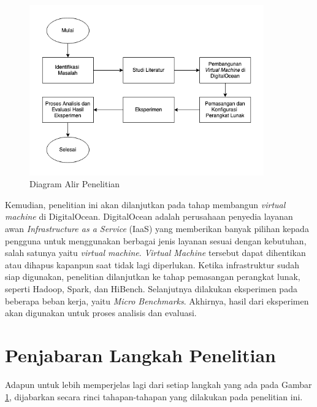 \begin{figure}[h!]
    \centering
    \includegraphics[width=0.9\textwidth]{figures/ch03/Diagram Tugas Akhir.png}
    \caption{Diagram Alir Penelitian}
    \label{fig:diagram alir}
\end{figure}

Kemudian, penelitian ini akan dilanjutkan pada tahap membangun \textit{virtual machine} di DigitalOcean. DigitalOcean adalah perusahaan penyedia layanan awan \textit{Infrastructure as a Service} (IaaS) yang memberikan banyak pilihan kepada pengguna untuk menggunakan berbagai jenis layanan sesuai dengan kebutuhan, salah satunya yaitu \textit{virtual machine}. \textit{Virtual Machine} tersebut dapat dihentikan atau dihapus kapanpun saat tidak lagi diperlukan. Ketika infrastruktur sudah siap digunakan, penelitian dilanjutkan ke tahap pemasangan perangkat lunak, seperti Hadoop, Spark, dan HiBench. Selanjutnya dilakukan eksperimen pada beberapa beban kerja, yaitu \textit{Micro Benchmarks}. Akhirnya, hasil dari eksperimen akan digunakan untuk proses analisis dan evaluasi.

\section{Penjabaran Langkah Penelitian}
Adapun untuk lebih memperjelas lagi dari setiap langkah yang ada pada Gambar \ref{fig:diagram alir}, dijabarkan secara rinci tahapan-tahapan yang dilakukan pada penelitian ini.

